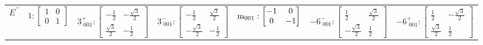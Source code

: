 \documentclass[fleqn,8pt,landscape]{jsarticle}
\begin{document}
\begin{longtable}{ccccccc}
$ E^{\prime\prime} $ & $ 1:\begin{bmatrix} 1 & 0 \\ 0 & 1 \end{bmatrix} $ & $ 3^{+}_{\,\,001}:\begin{bmatrix} - \frac{1}{2} & - \frac{\sqrt{3}}{2} \\ \frac{\sqrt{3}}{2} & - \frac{1}{2} \end{bmatrix} $ & $ 3^{-}_{\,\,001}:\begin{bmatrix} - \frac{1}{2} & \frac{\sqrt{3}}{2} \\ - \frac{\sqrt{3}}{2} & - \frac{1}{2} \end{bmatrix} $ & $ {\rm m}_{001}:\begin{bmatrix} -1 & 0 \\ 0 & -1 \end{bmatrix} $ & $ -6^{-}_{\,\,001}:\begin{bmatrix} \frac{1}{2} & \frac{\sqrt{3}}{2} \\ - \frac{\sqrt{3}}{2} & \frac{1}{2} \end{bmatrix} $ & $ -6^{+}_{\,\,001}:\begin{bmatrix} \frac{1}{2} & - \frac{\sqrt{3}}{2} \\ \frac{\sqrt{3}}{2} & \frac{1}{2} \end{bmatrix} $ \\
\end{longtable}
\end{document}
